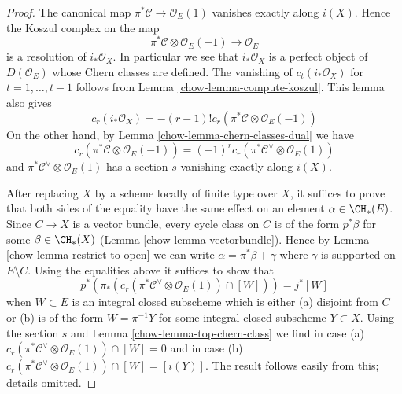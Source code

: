 \begin{proof}

The canonical map $\pi^*\mathcal{C} \to \mathcal{O}_E(1)$ vanishes
exactly along $i(X)$. Hence the Koszul complex on the map
$$
\pi^*\mathcal{C} \otimes \mathcal{O}_E(-1) \to \mathcal{O}_E
$$
is a resolution of $i_*\mathcal{O}_X$. In particular we see that
$i_*\mathcal{O}_X$ is a perfect object of $D(\mathcal{O}_E)$
whose Chern classes are defined. The vanishing of $c_t(i_*\mathcal{O}_X)$
for $t = 1, \ldots, t - 1$ follows from Lemma \ref{chow-lemma-compute-koszul}.
This lemma also gives
$$
c_r(i_*\mathcal{O}_X) = - (r - 1)!
c_r(\pi^*\mathcal{C} \otimes \mathcal{O}_E(-1))
$$
On the other hand, by Lemma \ref{chow-lemma-chern-classes-dual} we have
$$
c_r(\pi^*\mathcal{C} \otimes \mathcal{O}_E(-1)) =
(-1)^r c_r(\pi^*\mathcal{C}^\vee \otimes \mathcal{O}_E(1))
$$
and $\pi^*\mathcal{C}^\vee \otimes \mathcal{O}_E(1)$ has a section $s$
vanishing exactly along $i(X)$.

\medskip\noindent
After replacing $X$ by a scheme locally of finite type over $X$,
it suffices to prove that both sides of the equality have the
same effect on an element $\alpha \in \CH_*(E)$. Since $C \to X$
is a vector bundle, every cycle class on $C$ is of the form $p^*\beta$
for some $\beta \in \CH_*(X)$ (Lemma \ref{chow-lemma-vectorbundle}).
Hence by Lemma \ref{chow-lemma-restrict-to-open}
we can write $\alpha = \pi^*\beta + \gamma$ where $\gamma$
is supported on $E \setminus C$. Using the equalities above
it suffices to show that
$$
p^*(\pi_*(c_r(\pi^*\mathcal{C}^\vee \otimes \mathcal{O}_E(1)) \cap [W])) =
j^*[W]
$$
when $W \subset E$ is an integral closed subscheme which
is either (a) disjoint from $C$ or (b) is of the form $W = \pi^{-1}Y$
for some integral closed subscheme $Y \subset X$.
Using the section $s$ and Lemma \ref{chow-lemma-top-chern-class} we find
in case (a) $c_r(\pi^*\mathcal{C}^\vee \otimes \mathcal{O}_E(1)) \cap [W] = 0$
and in case (b)
$c_r(\pi^*\mathcal{C}^\vee \otimes \mathcal{O}_E(1)) \cap [W] = [i(Y)]$.
The result follows easily from this; details omitted.
\end{proof}

